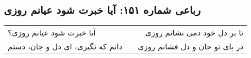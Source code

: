 \begin{center}
\section*{رباعی شماره ۱۵۱: آیا خبرت شود عیانم روزی}
\label{sec:151}
\begin{longtable}{l p{0.5cm} r}
آیا خبرت شود عیانم روزی؟
&&
تا بر دل خود دمی نشانم روزی
\\
دانم که نگیری، ای دل و جان، دستم
&&
در پای تو جان و دل فشانم روزی
\\
\end{longtable}
\end{center}

